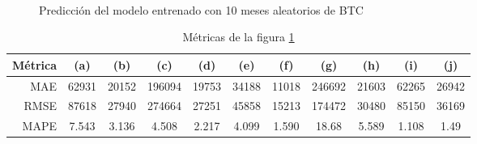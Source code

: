 \documentclass[a4paper,10pt]{article}
\begin{document}
\begin{figure}[h!]
    \\
  \caption{Predicción del modelo entrenado con 10 meses aleatorios de BTC}
  \label{f:btc_mth_prophet}
\end{figure}

\begin{table}[t]
 \begin{center}
  \begin{tabular}{|r|c|c|c|c|c|c|c|c|c|c|}
    Métrica & (a) & (b) & (c) & (d) & (e) & (f) & (g) & (h) & (i) & (j) \\ \hline
    MAE & 62931 & 20152 & 196094 & 19753 & 34188 & 11018 & 246692 & 21603 & 62265 & 26942 \\
    RMSE & 87618 & 27940 & 274664 & 27251 & 45858 & 15213 & 174472 & 30480 & 85150 & 36169 \\
    MAPE & 7.543 & 3.136 & 4.508 & 2.217 & 4.099 & 1.590 & 18.68 & 5.589 & 1.108 & 1.49 \\ \hline
  \end{tabular}
  \caption{Métricas de la figura \ref{f:btc_mth_prophet}}
  \label{tab:btc_prophet_m}
 \end{center}
\end{table}
\end{document}

